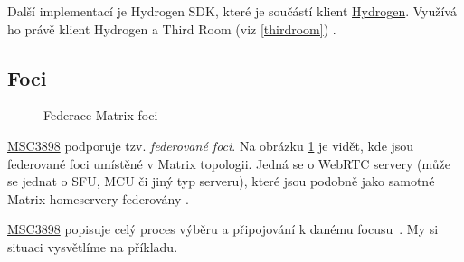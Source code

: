 Další implementací je Hydrogen SDK, které je součástí klient
\href{https://github.com/vector-im/hydrogen-web}{Hydrogen}. Využívá ho právě
klient Hydrogen a Third Room (viz \ref{thirdroom}) \cite{GitHub-Hydrogen}.

\subsection{Foci}\label{foci}

\begin{figure}[H]
    \centering
    \caption{Federace Matrix foci}
    \label{federatedFoci}
\end{figure}

\href{https://github.com/matrix-org/matrix-spec-proposals/pull/3898}{MSC3898}
podporuje tzv. \textit{federované foci}. Na obrázku \ref{federatedFoci} je
vidět, kde jsou federované foci umístěné v Matrix topologii. Jedná se o WebRTC
servery (může se jednat o SFU, MCU či jiný typ serveru), které jsou podobně jako
samotné Matrix homeservery federovány \cite{GitHub-MSC3898}.

\href{https://github.com/matrix-org/matrix-spec-proposals/pull/3898}{MSC3898}
popisuje celý proces výběru a připojování k danému focusu~\cite{GitHub-MSC3898}.
My si situaci vysvětlíme na příkladu.

